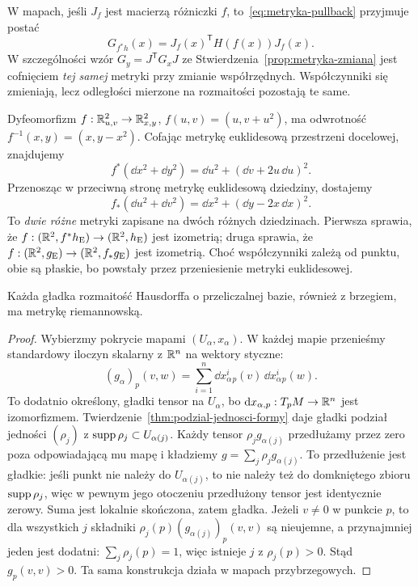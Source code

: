 W mapach, jeśli $J_f$ jest macierzą różniczki $f$,
to~\eqref{eq:metryka-pullback} przyjmuje postać
\[
 G_{f^*h}(x)=J_f(x)^{\mathsf T}H(f(x))J_f(x).
\]
W szczególności wzór
$G_y=J^{\mathsf T}G_xJ$ ze
Stwierdzenia~\ref{prop:metryka-zmiana} jest
cofnięciem \emph{tej samej} metryki przy zmianie
współrzędnych. Współczynniki się zmieniają, lecz
odległości mierzone na rozmaitości pozostają te same.

\begin{przyklad}
\label{prz:metryka-pull-push-przyklad}
Dyfeomorfizm $f:\mathbb{R}^2_{u,v}\to\mathbb{R}^2_{x,y}$,
$f(u,v)=(u,v+u^2)$, ma odwrotność
$f^{-1}(x,y)=(x,y-x^2)$. Cofając metrykę
euklidesową przestrzeni docelowej, znajdujemy
\[
 f^*(\dd x^2+\dd y^2)
 =\dd u^2+(\dd v+2u\,\dd u)^2.
\]
Przenosząc w przeciwną stronę metrykę euklidesową
dziedziny, dostajemy
\[
 f_*(\dd u^2+\dd v^2)
 =\dd x^2+(\dd y-2x\,\dd x)^2.
\]
To \emph{dwie różne} metryki zapisane na dwóch
różnych dziedzinach. Pierwsza sprawia, że
$f:(\mathbb{R}^2,f^*h_{\mathrm E})\to(\mathbb{R}^2,h_{\mathrm E})$
jest izometrią; druga sprawia, że
$f:(\mathbb{R}^2,g_{\mathrm E})\to(\mathbb{R}^2,f_*g_{\mathrm E})$
jest izometrią. Choć współczynniki zależą od punktu,
obie są płaskie, bo powstały przez przeniesienie
metryki euklidesowej.
\end{przyklad}

\begin{twierdzenie}
\label{thm:istnienie-metryki}
Każda gładka rozmaitość Hausdorffa o przeliczalnej bazie,
również z brzegiem, ma metrykę riemannowską.
\end{twierdzenie}
\begin{proof}
Wybierzmy pokrycie mapami $(U_\alpha,x_\alpha)$.
W każdej mapie przenieśmy standardowy iloczyn skalarny
z $\mathbb{R}^n$ na wektory styczne:
\[
 (g_\alpha)_p(v,w)
 =\sum_{i=1}^n
   \dd x_\alpha^i{}_p(v)\,\dd x_\alpha^i{}_p(w).
\]
To dodatnio określony, gładki tensor na $U_\alpha$,
bo $\mathrm d x_{\alpha,p}:T_pM\to\mathbb{R}^n$ jest izomorfizmem.
Twierdzenie~\ref{thm:podzial-jednosci-formy}
daje gładki podział jedności $(\rho_j)$
z $\operatorname{supp}\rho_j\subset U_{\alpha(j)}$.
Każdy tensor $\rho_jg_{\alpha(j)}$ przedłużamy przez
zero poza odpowiadającą mu mapę i kładziemy
$g=\sum_j\rho_jg_{\alpha(j)}$.
To przedłużenie jest gładkie: jeśli punkt nie należy
do $U_{\alpha(j)}$, to nie należy też do domkniętego
zbioru $\operatorname{supp}\rho_j$, więc w pewnym jego otoczeniu
przedłużony tensor jest identycznie zerowy.
Suma jest lokalnie skończona, zatem gładka.
Jeżeli $v\ne0$ w punkcie $p$, to dla wszystkich $j$
składniki $\rho_j(p)(g_{\alpha(j)})_p(v,v)$ są
nieujemne, a przynajmniej jeden jest dodatni:
$\sum_j\rho_j(p)=1$, więc istnieje $j$ z
$\rho_j(p)>0$. Stąd $g_p(v,v)>0$.
Ta sama konstrukcja działa w mapach przybrzegowych.
\end{proof}

